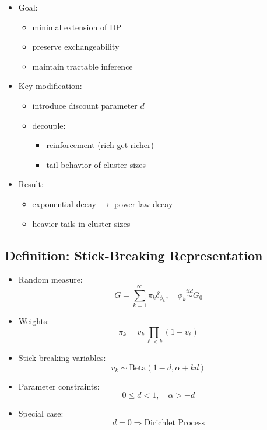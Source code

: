 \documentclass[12pt,oneside]{book}
\numberwithin{equation}{section}
\theoremstyle{definition}
\theoremstyle{plain}
\theoremstyle{remark}
\begin{document}
\begin{itemize}
\item Goal:
\begin{itemize}
\item minimal extension of DP
\item preserve exchangeability
\item maintain tractable inference
\end{itemize}

\item Key modification:
\begin{itemize}
\item introduce discount parameter $d$
\item decouple:
\begin{itemize}
\item reinforcement (rich-get-richer)
\item tail behavior of cluster sizes
\end{itemize}
\end{itemize}

\item Result:
\begin{itemize}
\item exponential decay $\rightarrow$ power-law decay
\item heavier tails in cluster sizes
\end{itemize}
\end{itemize}

\subsection*{Definition: Stick-Breaking Representation}

\begin{itemize}
\item Random measure:
\[
G = \sum_{k=1}^\infty \pi_k \delta_{\phi_k}, \quad \phi_k \stackrel{iid}{\sim} G_0
\]

\item Weights:
\[
\pi_k = v_k \prod_{\ell < k} (1 - v_\ell)
\]

\item Stick-breaking variables:
\[
v_k \sim \text{Beta}(1 - d, \alpha + k d)
\]

\item Parameter constraints:
\[
0 \le d < 1, \quad \alpha > -d
\]

\item Special case:
\[
d = 0 \Rightarrow \text{Dirichlet Process}
\]
\end{itemize}
\end{document}
